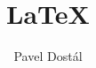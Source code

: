 \documentclass{article}
\title{LaTeX}
\author{Pavel Dostál}
\begin{document}
	\pagestyle{empty}
	\begin{multicols}{2}
		
		
		
	\columnbreak
		
		
		
		
	\end{multicols}
\pagebreak
	
	
\pagebreak
	
	
	
\end{document}
